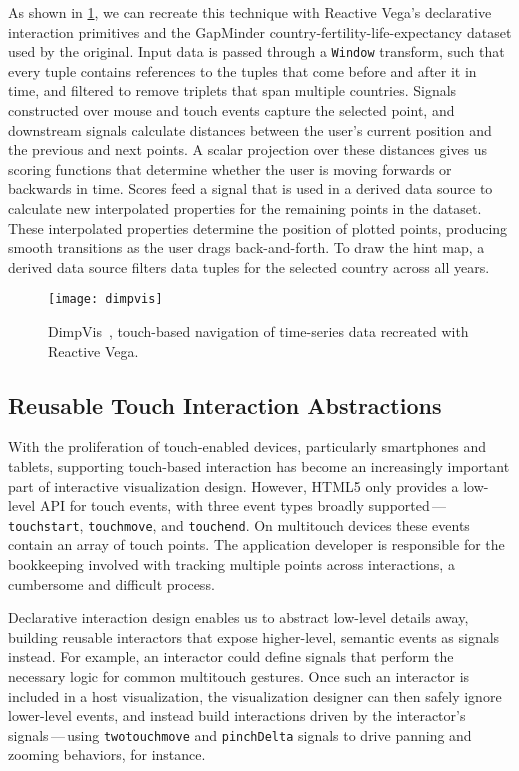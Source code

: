 As shown in \cref{fig:vg:dimpvis}, we can recreate this technique with Reactive
Vega's declarative interaction primitives and the GapMinder
country-fertility-life-expectancy dataset used by the original. Input data is
passed through a \texttt{Window} transform, such that every tuple contains
references to the tuples that come before and after it in time, and filtered to
remove triplets that span multiple countries. Signals constructed over mouse and
touch events capture the selected point, and downstream signals calculate
distances between the user's current position and the previous and next points.
A scalar projection over these distances gives us scoring functions that
determine whether the user is moving forwards or backwards in time. Scores feed
a signal that is used in a derived data source to calculate new interpolated
properties for the remaining points in the dataset. These interpolated
properties determine the position of plotted points, producing smooth
transitions as the user drags back-and-forth. To draw the hint map, a derived
data source filters data tuples for the selected country across all years.

\begin{figure}[h!]
  \centering
  \texttt{[image: dimpvis]}
  \caption{DimpVis~\cite{kondo:dimpvis}, touch-based navigation of time-series
  data recreated with Reactive Vega.}
  \label{fig:vg:dimpvis}
\end{figure}

\vspace{-10pt}

\subsection{Reusable Touch Interaction Abstractions}

\vspace{-7pt}

With the proliferation of touch-enabled devices, particularly smartphones and
tablets, supporting touch-based interaction has become an increasingly important
part of interactive visualization design. However, HTML5 only provides a
low-level API for touch events, with three event types broadly
supported\,---\,\texttt{touchstart}, \texttt{touchmove}, and \texttt{touchend}.
On multitouch devices these events contain an array of touch points. The
application developer is responsible for the bookkeeping involved with tracking
multiple points across interactions, a cumbersome and difficult process.

Declarative interaction design enables us to abstract low-level details away,
building reusable interactors that expose higher-level, semantic events as
signals instead. For example, an interactor could define signals that perform
the necessary logic for common multitouch gestures. Once such an interactor is
included in a host visualization, the visualization designer can then safely
ignore lower-level events, and instead build interactions driven by the
interactor's signals\,---\,using \texttt{twotouchmove} and \texttt{pinchDelta}
signals to drive panning and zooming behaviors, for instance.